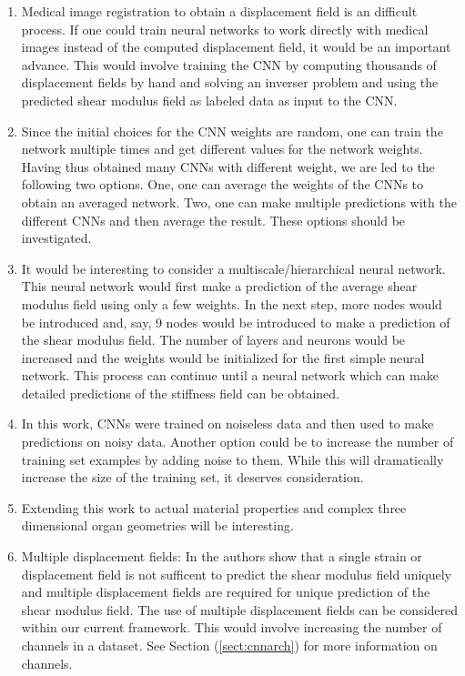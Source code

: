 \documentclass[12pt]{article}
\begin{document}
\begin{enumerate}
\item{Medical image registration to obtain a displacement field is an difficult process. If one could train neural networks to work directly with medical images instead of the computed displacement field, it would be an important advance. This would involve training the CNN by computing thousands of displacement fields by hand and solving an inverser problem and using the predicted shear modulus field as labeled data as input to the CNN.}
\item{Since the initial choices for the CNN weights are random, one can train the network multiple times and get different values for the network weights. Having thus obtained many CNNs with different weight, we are led to the following two options. One, one can average the weights of the CNNs to obtain an averaged network. Two, one can make multiple predictions with the different CNNs and then average the result. These options should be investigated.}
\item{It would be interesting to consider a multiscale/hierarchical neural network. This neural network would first make a prediction of the average shear modulus field using only a few weights. In the next step, more nodes would be introduced and, say, 9 nodes would be introduced to make a prediction of the shear modulus field. The number of layers and neurons would be increased and the weights would be initialized for the first simple neural network. This process can continue until a neural network which can make detailed predictions of the stiffness field can be obtained. }
\item{In this work, CNNs were trained on noiseless data and then used to make predictions on noisy data. Another option could be to increase the number of training set examples by adding noise to them. While this will dramatically increase the size of the training set, it deserves consideration.}
\item{Extending this work to actual material properties and complex three dimensional organ geometries will be interesting. }
\item{Multiple displacement fields: In \cite{paper:barbonegokhale,paper:barbonebamber} the authors show that a single strain or displacement field is not sufficent to predict the shear modulus field uniquely and multiple displacement fields are required for unique prediction of the shear modulus field. The use of multiple displacement fields can be considered within our current framework. This would involve increasing the number of channels in a dataset. See Section (\ref{sect:cnnarch}) for more information on channels.} 

\end{enumerate}
\end{document}
